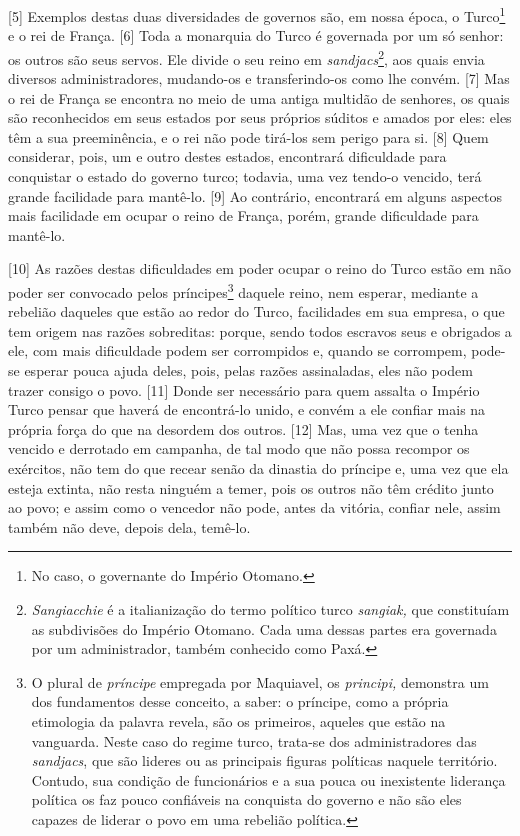{[}5{]} Exemplos destas duas diversidades de governos são, em nossa
época, o Turco\footnote{No caso, o governante do Império Otomano.} e o
rei de França. {[}6{]} Toda a monarquia do Turco é governada por um só
senhor: os outros são seus servos. Ele divide o seu reino em
\emph{sandjacs}\footnote{\emph{Sangiacchie} é a italianização do termo
  político turco \emph{sangiak,} que constituíam as subdivisões do
  Império Otomano. Cada uma dessas partes era governada por um
  administrador, também conhecido como Paxá.}, aos quais envia diversos
administradores, mudando-os e transferindo-os como lhe convém. {[}7{]}
Mas o rei de França se encontra no meio de uma antiga multidão de
senhores, os quais são reconhecidos em seus estados por seus próprios
súditos e amados por eles: eles têm a sua preeminência, e o rei não pode
tirá-los sem perigo para si. {[}8{]} Quem considerar, pois, um e outro
destes estados, encontrará dificuldade para conquistar o estado do
governo turco; todavia, uma vez tendo-o vencido, terá grande facilidade
para mantê-lo. {[}9{]} Ao contrário, encontrará em alguns aspectos mais
facilidade em ocupar o reino de França, porém, grande dificuldade para
mantê-lo.

{[}10{]} As razões destas dificuldades em poder ocupar o reino do Turco
estão em não poder ser convocado pelos príncipes\footnote{O plural de
  \emph{príncipe} empregada por Maquiavel, os \emph{principi,} demonstra
  um dos fundamentos desse conceito, a saber: o príncipe, como a própria
  etimologia da palavra revela, são os primeiros, aqueles que estão na
  vanguarda. Neste caso do regime turco, trata-se dos administradores
  das \emph{sandjacs}, que são lideres ou as principais figuras
  políticas naquele território. Contudo, sua condição de funcionários e
  a sua pouca ou inexistente liderança política os faz pouco confiáveis
  na conquista do governo e não são eles capazes de liderar o povo em
  uma rebelião política.} daquele reino, nem esperar, mediante a
rebelião daqueles que estão ao redor do Turco, facilidades em sua
empresa, o que tem origem nas razões sobreditas: porque, sendo todos
escravos seus e obrigados a ele, com mais dificuldade podem ser
corrompidos e, quando se corrompem, pode-se esperar pouca ajuda deles,
pois, pelas razões assinaladas, eles não podem trazer consigo o povo.
{[}11{]} Donde ser necessário para quem assalta o Império Turco pensar
que haverá de encontrá-lo unido, e convém a ele confiar mais na própria
força do que na desordem dos outros. {[}12{]} Mas, uma vez que o tenha
vencido e derrotado em campanha, de tal modo que não possa recompor os
exércitos, não tem do que recear senão da dinastia do príncipe e, uma
vez que ela esteja extinta, não resta ninguém a temer, pois os outros
não têm crédito junto ao povo; e assim como o vencedor não pode, antes
da vitória, confiar nele, assim também não deve, depois dela, temê-lo.

